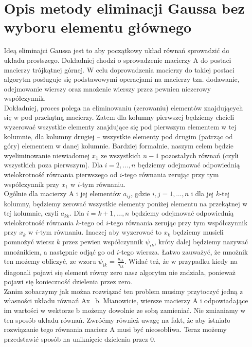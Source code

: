 \documentclass[]{article}
\begin{document}
	\section*{Opis metody eliminacji Gaussa bez wyboru elementu głównego}
	Ideą eliminajci Gaussa jest to aby początkowy układ równań sprowadzić do układu prostszego. Dokładniej chodzi o sprowadzenie macierzy A do postaci macierzy trójkątnej górnej. W celu doprowadzenia macierzy do takiej postaci algorytm posługuje się podstawowymi operacjami na macierzy tzn. dodawanie, odejmowanie wierszy oraz mnożenie wierszy przez pewnien niezerowy współczynnik. \\
	Dokładniej, proces polega na eliminowaniu (zerowaniu) elementów znajdujących się w pod przekątną macierzy.
	Zatem dla kolumny pierwszej będziemy chcieli wyzerować wszystkie elementy znajdujące się pod pierwszym elementem w tej kolumnie, dla kolumny drugiej -- wszystkie elementy pod drugim (patrząc od góry) elementem w danej kolumnie. Bardziej formalnie, naszym celem będzie wyeliminowanie niewiadomej $x_1$ ze wszystkich $n-1$ pozostałych równań (czyli wszystkich poza pierwszym). Dla $i = 2,\ldots,n$ będziemy odejmować odpowiednią wielokrotność równania pierwszego od $i$-tego równania zerując przy tym współczynnik przy $x_1$ w $i$-tym równaniu. \\
	Ogólnie dla macierzy A i jej elementów $a_{ij}$, gdzie $i,j = 1,\ldots,n$ i dla jej $k$-tej kolumny, będziemy zerować wszystkie elementy poniżej elementu na przekątnej w tej kolumnie, czyli $a_{kk}$. Dla $i = k+1,\ldots,n$ będziemy odejmować odpowiednią wielokrotność równania $k$-tego od $i$-tego równania zerując przy tym współczynnik przy $x_k$ w $i$-tym równaniu. Inaczej aby wyzerować to $x_k$ będziemy musieli pomnożyć wiersz $k$ przez pewien współczynnik $\psi_{ik}$, króty dalej będziemy nazywać mnożnikiem, a następnie odjąć go od $i$-tego wiersza. Łatwo zauważyć, że mnożnik ten możemy obliczyć, ze wzoru $\psi_{ik}$ = $\frac{a_{ik}}{a_{kk}}$. Widać też, że w przypadku kiedy na diagonali pojawi się element równy zero nasz algorytm nie zadziała, ponieważ pojawi się konieczność dzielenia przez zero. \\
	Zanim zobaczymy jak można rozwiązać ten problem musimy przytoczyć jedną z własności układu równań Ax=b. Mianowicie, wiersze macierzy A i odpowiadające im wartości w wektorze b możemy dowolnie ze sobą zamieniać. Nie zmianiamy w ten sposób układu równań.
	Zwróćmy również uwagę na fakt, że aby istniało rozwiązanie tego równania macierz A musi być nieosobliwa. 
	Teraz możemy przedstawić sposób na uniknięcie dzielenia przez 0. 
	\clearpage
\end{document}
